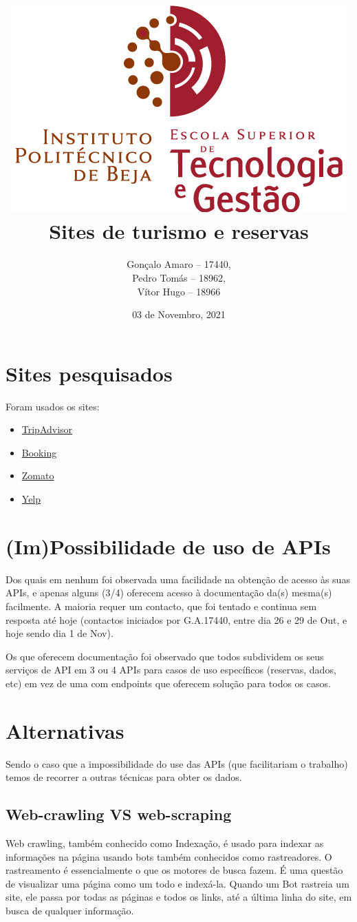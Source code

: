 \documentclass[a4paper,10pt]{article}
\title{\includegraphics[scale=0.2]{estig_logo.png}\\[0.5cm]Sites de turismo e reservas} %
\author{Gonçalo Amaro -- 17440,\\ Pedro Tomás -- 18962,\\ Vítor Hugo -- 18966} %
\date{03 de Novembro, 2021} %
\begin{document}
\maketitle

\section{Sites pesquisados}

Foram usados os sites:
\begin{itemize}
    \item \href{https://www.tripadvisor.com/}{TripAdvisor}
    \item \href{https://www.booking.com/}{Booking}
    \item \href{https://www.zomato.com/}{Zomato}
    \item \href{https://www.yelp.com/}{Yelp}
\end{itemize}

\section{(Im)Possibilidade de uso de APIs}

Dos quais em nenhum foi observada uma facilidade na obtenção de acesso às suas APIs, e apenas alguns (3/4) oferecem acesso à documentação da(s) mesma(s) facilmente.
A maioria requer um contacto, que foi tentado e continua sem resposta até hoje (contactos iniciados por G.A.17440, entre dia 26 e 29 de Out, e hoje sendo dia 1 de Nov).

Os que oferecem documentação foi observado que todos subdividem os seus serviços de API em 3 ou 4 APIs para casos de uso específicos (reservas, dados, etc) em vez de uma com endpoints que oferecem solução para todos os casos.

\section{Alternativas}

Sendo o caso que a impossibilidade do use das APIs (que facilitariam o trabalho) temos de recorrer a outras técnicas para obter os dados.

\subsection{Web-crawling VS web-scraping}

Web crawling, também conhecido como Indexação, é usado para indexar as informações na página usando bots também conhecidos como rastreadores.
O rastreamento é essencialmente o que os motores de busca fazem.
É uma questão de visualizar uma página como um todo e indexá-la.
Quando um Bot rastreia um site, ele passa por todas as páginas e todos os links, até a última linha do site, em busca de qualquer informação.
\end{document}
